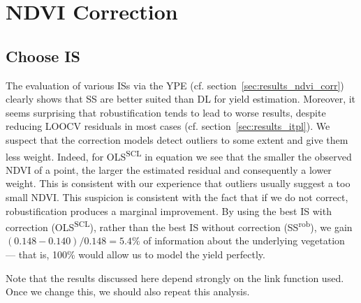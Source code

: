 \section{NDVI Correction}{\label{sec:discussion_corr}
    \subsection{Choose {{IS}}}\label{sec:discussion_iplfstrategy-choose}

    The evaluation of various ISs via the YPE (cf. section~\ref{sec:results_ndvi_corr}) clearly shows that SS are better suited than DL for yield estimation. Moreover, it seems surprising that robustification tends to lead to worse results, despite reducing LOOCV residuals in most cases (cf. section~\ref{sec:results_itpl}). We suspect that the correction models detect outliers to some extent and give them less weight. Indeed, for OLS\textsuperscript{SCL} in equation  we see that the smaller the observed NDVI of a point, the larger the estimated residual and consequently a lower weight. This is consistent with our experience that outliers usually suggest a too small NDVI. This suspicion is consistent with the fact that if we do not correct, robustification produces a marginal improvement. 
    By using the best IS with correction (OLS\textsuperscript{SCL}), rather than the best IS without correction (SS\textsuperscript{rob}), we gain $(0.148-0.140)/0.148 = 5.4\%$ of information about the underlying vegetation --- that is, 100\% would allow us to model the yield perfectly.
    
    Note that the results discussed here depend strongly on the link function used. Once we change this, we should also repeat this analysis.
            


}
